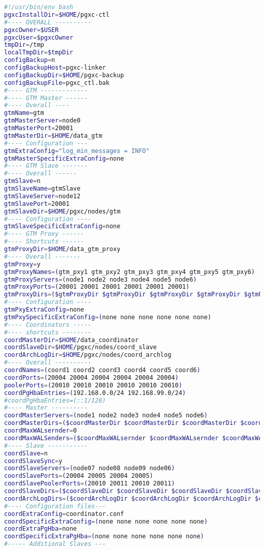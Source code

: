 \label{appendix:pgxcctlconfig} 
\begin{lstlisting}[basicstyle=\tiny,language=bash,caption={Konfigurationsdatei pgxc-ctl}]
#!/usr/bin/env bash
pgxcInstallDir=$HOME/pgxc-ctl
#---- OVERALL ----------
pgxcOwner=$USER	
pgxcUser=$pgxcOwner
tmpDir=/tmp
localTmpDir=$tmpDir	
configBackup=n	
configBackupHost=pgxc-linker
configBackupDir=$HOME/pgxc-backup
configBackupFile=pgxc_ctl.bak
#---- GTM -------------
#---- GTM Master ------
#---- Overall ----
gtmName=gtm
gtmMasterServer=node0
gtmMasterPort=20001
gtmMasterDir=$HOME/data_gtm
#---- Configuration ---
gtmExtraConfig="log_min_messages = INFO"
gtmMasterSpecificExtraConfig=none
#---- GTM Slave -------
#---- Overall ------
gtmSlave=n	
gtmSlaveName=gtmSlave
gtmSlaveServer=node12
gtmSlavePort=20001
gtmSlaveDir=$HOME/pgxc/nodes/gtm
#---- Configuration ----
gtmSlaveSpecificExtraConfig=none 
#---- GTM Proxy ------
#---- Shortcuts ------
gtmProxyDir=$HOME/data_gtm_proxy
#---- Overall -------
gtmProxy=y	
gtmProxyNames=(gtm_pxy1 gtm_pxy2 gtm_pxy3 gtm_pxy4 gtm_pxy5 gtm_pxy6)
gtmProxyServers=(node1 node2 node3 node4 node5 node6)
gtmProxyPorts=(20001 20001 20001 20001 20001 20001)
gtmProxyDirs=($gtmProxyDir $gtmProxyDir $gtmProxyDir $gtmProxyDir $gtmProxyDir $gtmProxyDir)
#---- Configuration ----
gtmPxyExtraConfig=none
gtmPxySpecificExtraConfig=(none none none none none none)
#---- Coordinators -----
#---- shortcuts --------
coordMasterDir=$HOME/data_coordinator
coordSlaveDir=$HOME/pgxc/nodes/coord_slave
coordArchLogDir=$HOME/pgxc/nodes/coord_archlog
#---- Overall ----------
coordNames=(coord1 coord2 coord3 coord4 coord5 coord6)
coordPorts=(20004 20004 20004 20004 20004 20004)
poolerPorts=(20010 20010 20010 20010 20010 20010)
coordPgHbaEntries=(192.168.0.0/24 192.168.99.0/24)
#coordPgHbaEntries=(::1/128)
#---- Master ----------
coordMasterServers=(node1 node2 node3 node4 node5 node6)
coordMasterDirs=($coordMasterDir $coordMasterDir $coordMasterDir $coordMasterDir $coordMasterDir $coordMasterDir)
coordMaxWALsernder=0
coordMaxWALSenders=($coordMaxWALsernder $coordMaxWALsernder $coordMaxWALsernder $coordMaxWALsernder $coordMaxWALsernder $coordMaxWALsernder )
#---- Slave -----------
coordSlave=n
coordSlaveSync=y
coordSlaveServers=(node07 node08 node09 node06)
coordSlavePorts=(20004 20005 20004 20005)
coordSlavePoolerPorts=(20010 20011 20010 20011)
coordSlaveDirs=($coordSlaveDir $coordSlaveDir $coordSlaveDir $coordSlaveDir)
coordArchLogDirs=($coordArchLogDir $coordArchLogDir $coordArchLogDir $coordArchLogDir)
#---- Configuration files---
coordExtraConfig=coordinator.conf
coordSpecificExtraConfig=(none none none none none none)
coordExtraPgHba=none
coordSpecificExtraPgHba=(none none none none none none)
#----- Additional Slaves ---


\end{lstlisting}
